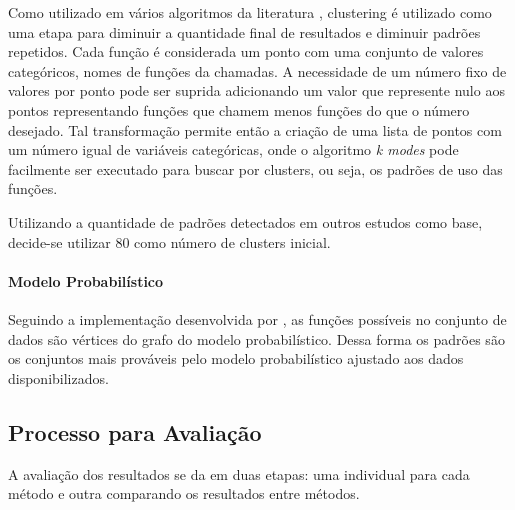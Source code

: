 Como utilizado em vários algoritmos da literatura\cite{mapo} \cite{groums}
 \cite{oop_pattern_mining}, clustering é utilizado como
uma etapa para diminuir a quantidade final de resultados e diminuir padrões
repetidos. Cada função é considerada um ponto com uma conjunto de valores
categóricos, nomes de funções da chamadas. A necessidade de um número fixo de
valores por ponto pode ser suprida adicionando um valor que represente nulo aos
pontos representando funções que chamem menos funções do que o número desejado.
Tal transformação permite então a criação de uma lista de pontos com um número
igual de variáveis categóricas, onde o algoritmo \textit{k modes} pode
facilmente ser executado para buscar por clusters, ou seja, os padrões de uso
das funções.

Utilizando a quantidade de padrões detectados em outros estudos como
base\cite{comp_mining_source_code}, decide-se utilizar 80 como número de
clusters inicial.

\paragraph{Modelo Probabilístico}

Seguindo a implementação desenvolvida por \cite{probabilistic_api_miner}, as
funções possíveis no conjunto de dados são vértices do grafo do modelo
probabilístico. Dessa forma os padrões são os conjuntos mais prováveis pelo
modelo probabilístico ajustado aos dados disponibilizados.

\subsection{Processo para Avaliação} \label{sec:evaluation}
A avaliação dos resultados se da em duas etapas: uma individual para cada método
e outra comparando os resultados entre métodos.

